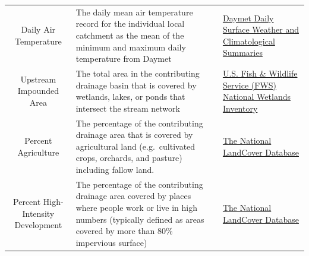 \documentclass[]{article}
\begin{document}
\begin{longtable}[]{@{}cll@{}}
\begin{minipage}[t]{0.19\columnwidth}\centering\strut
Daily Air Temperature\strut
\end{minipage} & \begin{minipage}[t]{0.43\columnwidth}\raggedright\strut
The daily mean air temperature record for the individual local catchment
as the mean of the minimum and maximum daily temperature from
Daymet\strut
\end{minipage} & \begin{minipage}[t]{0.23\columnwidth}\raggedright\strut
\href{https://daymet.ornl.gov/}{Daymet Daily Surface Weather and
Climatological Summaries}\strut
\end{minipage}\tabularnewline
\begin{minipage}[t]{0.19\columnwidth}\centering\strut
Upstream Impounded Area\strut
\end{minipage} & \begin{minipage}[t]{0.43\columnwidth}\raggedright\strut
The total area in the contributing drainage basin that is covered by
wetlands, lakes, or ponds that intersect the stream network\strut
\end{minipage} & \begin{minipage}[t]{0.23\columnwidth}\raggedright\strut
\href{http://www.fws.gov/wetlands/Data/Data-Download.html}{U.S. Fish \&
Wildlife Service (FWS) National Wetlands Inventory}\strut
\end{minipage}\tabularnewline
\begin{minipage}[t]{0.19\columnwidth}\centering\strut
Percent Agriculture\strut
\end{minipage} & \begin{minipage}[t]{0.43\columnwidth}\raggedright\strut
The percentage of the contributing drainage area that is covered by
agricultural land (e.g.~cultivated crops, orchards, and pasture)
including fallow land.\strut
\end{minipage} & \begin{minipage}[t]{0.23\columnwidth}\raggedright\strut
\href{http://www.mrlc.gov/nlcd06_data.php}{The National LandCover
Database}\strut
\end{minipage}\tabularnewline
\begin{minipage}[t]{0.19\columnwidth}\centering\strut
Percent High-Intensity Development\strut
\end{minipage} & \begin{minipage}[t]{0.43\columnwidth}\raggedright\strut
The percentage of the contributing drainage area covered by places where
people work or live in high numbers (typically defined as areas covered
by more than 80\% impervious surface)\strut
\end{minipage} & \begin{minipage}[t]{0.23\columnwidth}\raggedright\strut
\href{http://www.mrlc.gov/nlcd06_data.php}{The National LandCover
Database}\strut
\end{minipage}\tabularnewline
\bottomrule
\end{longtable}
\end{document}

